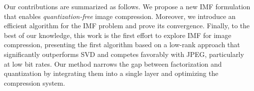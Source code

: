 Our contributions are summarized as follows. We propose a new IMF formulation that enables \emph{quantization-free} image compression. Moreover, we introduce an efficient algorithm for the IMF problem and prove its convergence. Finally, to the best of our knowledge, this work is the first effort to explore IMF for image compression, presenting the first algorithm based on a low-rank approach that significantly outperforms SVD and competes favorably with JPEG, particularly at low bit rates. Our method narrows the gap between factorization and quantization by integrating them into a single layer and optimizing the compression system.